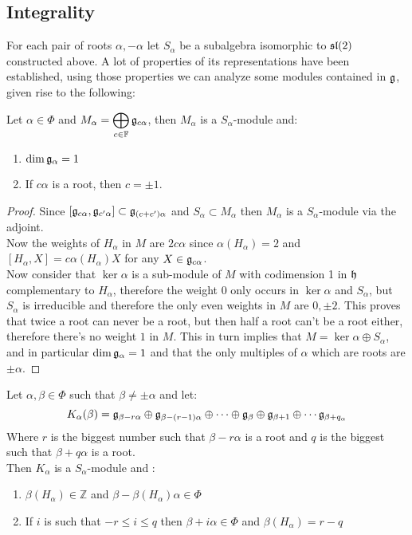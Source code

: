 \subsection*{Integrality}
For each pair of roots $\alpha,-\alpha$ let $S_\alpha$ be a subalgebra isomorphic to $\mathfrak{sl}(2)$ constructed above. A lot of properties of its representations have been established, using those properties we can analyze some modules contained in $\mathfrak{g}$, given rise to the following:
\begin{prop}
	Let $\alpha \in \Phi$ and $M_\alpha=\displaystyle\bigoplus_{c \in\mathbb{F}} \mathfrak{g}_{c\alpha}$, then $M_\alpha$ is a $S_\alpha$-module and:
	\begin{enumerate}[label=(\alph*)]
		\item $\dim\mathfrak{g}_\alpha = 1$
		\item If $c\alpha$ is a root, then $c=\pm 1$.
	\end{enumerate}
	\label{IntegralityM}
\end{prop}
\begin{proof}
	Since $[\mathfrak{g}_{c\alpha},\mathfrak{g}_{c'\alpha}]\subset \mathfrak{g}_{(c+c')\alpha}$ and $S_\alpha \subset M_\alpha$ then $M_\alpha$ is a $S_\alpha$-module via the adjoint.\\
	Now the weights of $H_\alpha$ in $M$ are $2c\alpha$ since $\alpha(H_\alpha)=2$ and $[H_\alpha,X] = c\alpha(H_\alpha)X$ for any $X \in \mathfrak{g}_{c\alpha}$.\\
	Now consider that $\ker \alpha$ is a sub-module of $M$ with codimension 1 in $\mathfrak{h}$ complementary to $H_\alpha$, therefore the weight $0$ only occurs in $\ker \alpha$ and $S_\alpha$, but $S_\alpha$ is irreducible and therefore the only even weights in $M$ are $0,\pm 2$. This proves that twice a root can never be a root, but then half a root can't be a root either, therefore there's no weight $1$ in $M$. This in turn implies that $M=\ker \alpha \oplus S_\alpha$, and in particular $\dim\mathfrak{g}_\alpha=1$ and that the only multiples of $\alpha$ which are roots are $\pm \alpha$.
\end{proof}
\begin{prop}
	Let $\alpha,\beta \in \Phi$ such that $\beta \not= \pm \alpha$ and let:
	$$K_\alpha(\beta) = \mathfrak{g}_{\beta - r \alpha} \oplus \mathfrak{g}_{\beta - (r-1)\alpha} \oplus \cdots \oplus \mathfrak{g}_{\beta} \oplus \mathfrak{g}_{\beta+1} \oplus \cdots \mathfrak{g}_{\beta + q_\alpha}$$
	Where $r$ is the biggest number such that $\beta - r\alpha$ is a root and $q$ is the biggest such that $\beta + q\alpha$ is a root. \\
	Then $K_\alpha$ is a $S_\alpha$-module and :
	\begin{enumerate}
		\item $\beta(H_\alpha) \in \mathbb{Z}$ and $\beta-\beta(H_\alpha)\alpha \in \Phi$
		\item If $i$ is such that $-r\le i \le q$ then $\beta + i \alpha \in \Phi$ and $\beta(H_\alpha) = r-q$
	\end{enumerate}
	\label{IntegralityK}
\end{prop}
